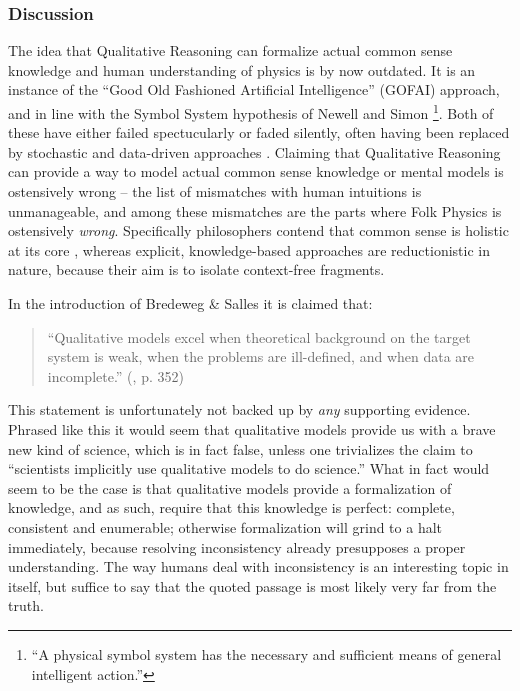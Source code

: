 \documentclass{article} %
\begin{document}
\subsubsection{Discussion}
\label{sec:litrev_qr_discussion}
The idea that Qualitative Reasoning can formalize actual common sense knowledge
and human understanding of physics is by now outdated. It is an instance of the
``Good Old Fashioned Artificial Intelligence'' (GOFAI) approach,
\cite{haugeland} and in line with the Symbol System hypothesis of Newell and
Simon \cite{newell}\footnote{``A physical symbol system has the necessary and
sufficient means of general intelligent action.''}.  Both of these have either
failed spectucularly or faded silently, often having been replaced by
stochastic and data-driven approaches \cite{russellnorvig}.  Claiming that
Qualitative Reasoning can provide a way to model actual common sense knowledge
or mental models is ostensively wrong -- the list of mismatches with human
intuitions is unmanageable, and among these mismatches are the parts where Folk
Physics is ostensively {\em wrong}. Specifically philosophers contend that
common sense is holistic at its core \cite{smith}, whereas explicit,
knowledge-based approaches are reductionistic in nature, because their aim is
to isolate context-free fragments. 

In the introduction of Bredeweg \& Salles \cite{bredeweg-eco} it is claimed
that:

	\begin{quote}
	``Qualitative models excel when theoretical background on the target
	system is weak, when the problems are ill-defined, and when data are
	incomplete.'' (\cite{bredeweg-eco}, p. 352)
	\end{quote}

This statement is unfortunately not backed up by {\em any} supporting evidence.
Phrased like this it would seem that qualitative models provide us with a brave
new kind of science, which is in fact false, unless one trivializes the claim
to ``scientists implicitly use qualitative models to do science.'' What in fact
would seem to be the case is that qualitative models provide a formalization
of knowledge, and as such, require that this knowledge is perfect: complete,
consistent and enumerable; otherwise formalization will grind to a halt
immediately, because resolving inconsistency already presupposes a proper
understanding. The way humans deal with inconsistency is an interesting topic
in itself, but suffice to say that the quoted passage is most likely very far
from the truth.
\end{document}
